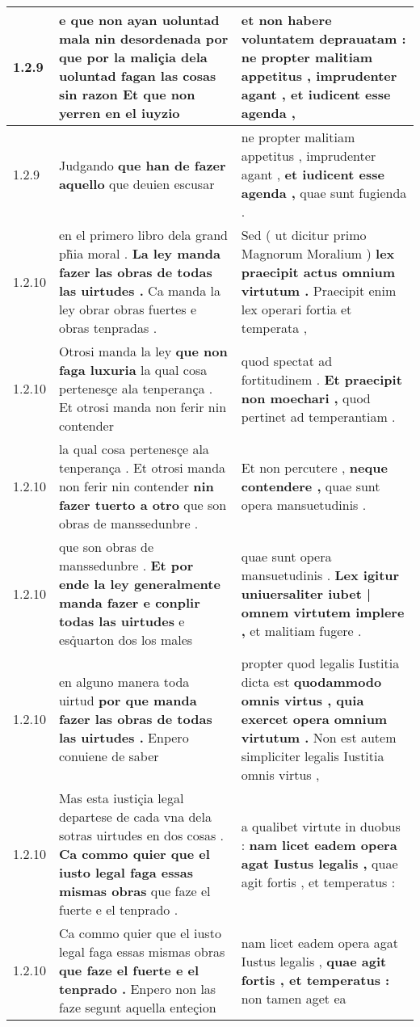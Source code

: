 \begin{tabular}{|p{1cm}|p{6.5cm}|p{6.5cm}|}
1.2.9 & e que non ayan uoluntad mala nin desordenada \textbf{ por que por la maliçia dela uoluntad fagan las cosas sin razon } Et que non yerren en el iuyzio & et non habere voluntatem deprauatam : \textbf{ ne propter malitiam appetitus , imprudenter agant , } et iudicent esse agenda , \\\hline
1.2.9 & Judgando \textbf{ que han de fazer aquello } que deuien escusar & ne propter malitiam appetitus , imprudenter agant , \textbf{ et iudicent esse agenda , } quae sunt fugienda . \\\hline
1.2.10 & en el primero libro dela grand ph̃ia moral . \textbf{ La ley manda fazer las obras de todas las uirtudes . } Ca manda la ley obrar obras fuertes e obras tenpradas . & Sed ( ut dicitur primo Magnorum Moralium ) \textbf{ lex praecipit actus omnium virtutum . } Praecipit enim lex operari fortia et temperata , \\\hline
1.2.10 & Otrosi manda la ley \textbf{ que non faga luxuria } la qual cosa pertenesçe ala tenperança . Et otrosi manda non ferir nin contender & quod spectat ad fortitudinem . \textbf{ Et praecipit non moechari , } quod pertinet ad temperantiam . \\\hline
1.2.10 & la qual cosa pertenesçe ala tenperança . Et otrosi manda non ferir nin contender \textbf{ nin fazer tuerto a otro } que son obras de manssedunbre . & Et non percutere , \textbf{ neque contendere , } quae sunt opera mansuetudinis . \\\hline
1.2.10 & que son obras de manssedunbre . \textbf{ Et por ende la ley generalmente manda fazer e conplir todas las uirtudes } e esq̉uarton dos los males & quae sunt opera mansuetudinis . \textbf{ Lex igitur uniuersaliter iubet | omnem virtutem implere , } et malitiam fugere . \\\hline
1.2.10 & en alguno manera toda uirtud \textbf{ por que manda fazer las obras de todas las uirtudes . } Enpero conuiene de saber & propter quod legalis Iustitia dicta est \textbf{ quodammodo omnis virtus , quia exercet opera omnium virtutum . } Non est autem simpliciter legalis Iustitia omnis virtus , \\\hline
1.2.10 & Mas esta iustiçia legal departese de cada vna dela sotras uirtudes en dos cosas . \textbf{ Ca commo quier que el iusto legal faga essas mismas obras } que faze el fuerte e el tenprado . & a qualibet virtute in duobus : \textbf{ nam licet eadem opera agat Iustus legalis , } quae agit fortis , et temperatus : \\\hline
1.2.10 & Ca commo quier que el iusto legal faga essas mismas obras \textbf{ que faze el fuerte e el tenprado . } Enpero non las faze segunt aquella enteçion & nam licet eadem opera agat Iustus legalis , \textbf{ quae agit fortis , et temperatus : } non tamen aget ea \\\hline

\end{tabular}

